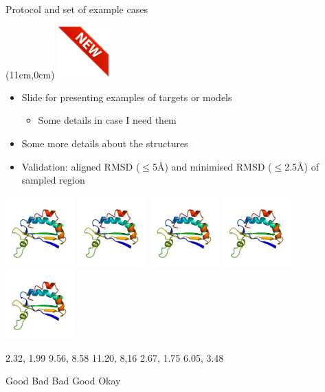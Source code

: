 \documentclass{beamer}
\newcommand{\new}{%
  \begin{textblock*}{2cm}(11cm,0cm) %
\includegraphics[width=2cm]{new.png}
\end{textblock*}
}
\begin{document}
\begin{frame}{Protocol and set of example cases}
  \new
  \begin{itemize}
    \item Slide for presenting examples of targets or models 
      \begin{itemize}
        \item Some details in case I need them %
      \end{itemize}
    \item Some more details about the structures 
    \item Validation: aligned RMSD ($\leq$5\AA) and minimised RMSD ($\leq$2.5\AA) of sampled region
  \end{itemize}
\includegraphics[width=0.2\textwidth]{2OKQA.png}
\includegraphics[width=0.2\textwidth]{2OKQA.png}
\includegraphics[width=0.2\textwidth]{2OKQA.png}
\includegraphics[width=0.2\textwidth]{2OKQA.png}
\includegraphics[width=0.2\textwidth]{2OKQA.png}

\small \hspace{15pt} 2.32, 1.99 \hfill 9.56, 8.58 \hfill 11.20, 8,16 \hfill 2.67, 1.75 \hfill 6.05, 3.48  \hspace{15pt}

\small \hspace{25pt} Good  \hfill    Bad  \hfill   Bad  \hfill   Good  \hfill   Okay \hspace{25pt}
\end{frame}
\end{document}
